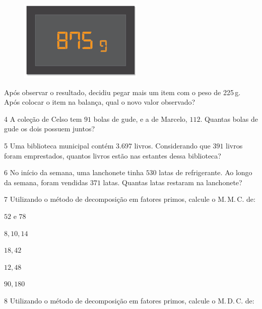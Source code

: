 {\begin{figure}
\centering\includegraphics[width=2.33333in,height=1.53125in]{./imgSAEB_6_MAT/media/image23.png}
\end{figure}

Após observar o resultado, decidiu pegar mais um item com o peso de
225\,g. Após colocar o item na balança, qual o novo valor observado?


\num{4}  A coleção de Celso tem $91$ bolas de gude, e a de Marcelo, $112$. Quantas
bolas de gude os dois possuem juntos?



\num{5}  Uma biblioteca municipal contém $3.697$ livros. Considerando que $391$
livros foram emprestados, quantos livros estão nas estantes dessa
biblioteca?


\num{6}  No início da semana, uma lanchonete tinha $530$ latas de refrigerante.
Ao longo da semana, foram vendidas $371$ latas. Quantas latas restaram na
lanchonete?


\num{7}  Utilizando o método de decomposição em fatores primos, calcule o
M.\,M.\,C. de:

\begin{escolha}
\item $52$ e $78$ 
\item $8,10,14$ 
\item $18,42$ 
\item $12,48$ 
\item $90,180$ 
\end{escolha}

\num{8}  Utilizando o método de decomposição em fatores primos, calcule o
M.\,D.\,C. de:

}

